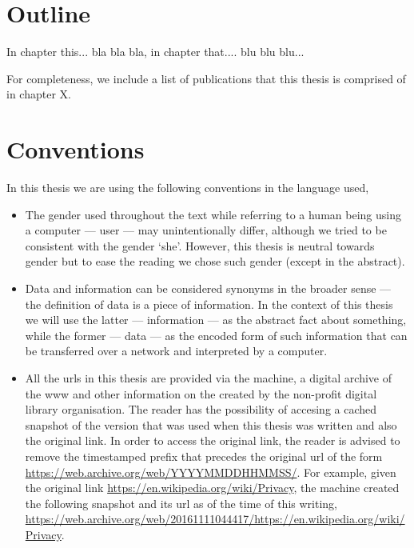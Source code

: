 \documentclass[showtrims,oldfontcommands]{kthesis}
\begin{document}
\section{Outline}
In chapter this... bla bla bla, in chapter that.... blu blu blu...

For completeness, we include a list of publications that this thesis is comprised 
of in chapter X. 


\section{Conventions}
In this thesis we are using the following conventions in the language used,
\begin{itemize}
    \item The gender used throughout the text while referring to a human being using 
    a computer --- user --- may unintentionally differ, although we tried to be 
    consistent with the gender `she'. However, this thesis is neutral towards gender 
    but to ease the reading we chose such gender (except in the abstract).

    \item Data and information can be considered synonyms in the broader sense --- 
    the definition of data is a piece of information. In the context of this thesis 
    we will use the latter --- information --- as the abstract fact about something, 
    while the former --- data --- as the encoded form of such information that can 
    be transferred over a network and interpreted by a computer.
    
    \item All the \acp{url} in this thesis are provided via the \Wayback machine, 
     a digital archive of the \ac{www} and other information on the \Internet created 
     by the \InternetArchive non-profit digital library organisation. The reader 
     has the possibility of accesing a cached snapshot of the version that was used 
     when this thesis was written and also the original link. In order to access 
     the original link, the reader is advised to remove the timestamped prefix that 
     precedes the original \ac{url} of the form \url{https://web.archive.org/web/YYYYMMDDHHMMSS/}. For 
     example, given the original link \url{https://en.wikipedia.org/wiki/Privacy}, 
     the \Wayback machine created the following snapshot and its \ac{url} as of 
     the time of this writing, \url{https://web.archive.org/web/20161111044417/https://en.wikipedia.org/wiki/Privacy}.
\end{itemize}
\end{document}
